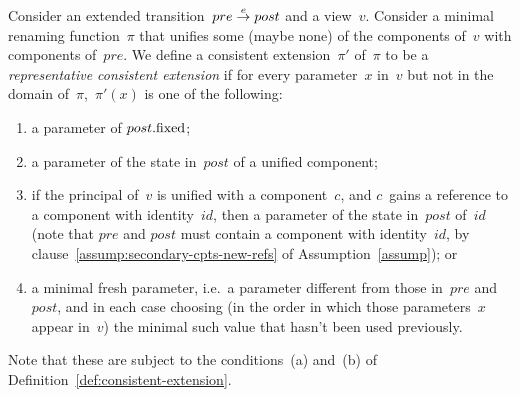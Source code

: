 
\begin{definition}
\label{def:representative-consistent-extension}
Consider an extended transition~$pre \stackrel{e}\rightarrow post$ and a view~$v$. 
Consider a minimal renaming function~$\pi$ that unifies some (maybe none) of the
components of~$v$ with components of~$pre$.  We define a consistent
extension~$\pi'$ of~$\pi$ to be a \emph{representative consistent extension}
if for every parameter~$x$ in~$v$ but not in the domain of~$\pi$,\, $\pi'(x)$
is one of the following:
%
\begin{enumerate}
\item\label{clause:remap-1} a parameter of $post.\mathrm{fixed}$; 

\item\label{clause:remap-2} a parameter of the state in~$post$ of a unified
  component;

\item\label{clause:remap-3} if the principal of~$v$ is unified with a
  component~$c$, and $c$~gains a reference to a component with identity~$id$,
  then a parameter of the state in~$post$ of~$id$ (note that $pre$ and $post$
  must contain a component with identity~$id$, by
  clause~\ref{assump:secondary-cpts-new-refs} of Assumption~\ref{assump}); or

\item\label{clause:remap-4} a minimal fresh parameter, i.e.~a parameter
  different from those in~$pre$ and~$post$, and in each case choosing (in the
  order in which those parameters~$x$ appear in~$v$) the minimal such value
  that hasn't been used previously. 
\end{enumerate}
%
%
Note that these are subject to the conditions~(a) and~(b) of
Definition~\ref{def:consistent-extension}. 
\end{definition}
%


